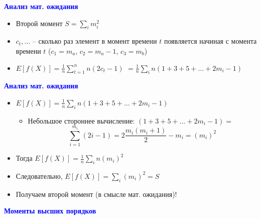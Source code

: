 \documentclass[landscape]{slides}
\begin{document}
\begin{normalsize}
\begin{slide}
\textbf{\textcolor{blue}{Анализ мат. ожидания}}

\begin{itemize}
\item Второй момент $S=\sum_i m_i^2$
\item $c_t,\ldots$ -- сколько раз элемент в момент времени $t$ появляется начиная с момента времени $t$ ($c_1=m_a$, $c_2=m_a-1$, $c_3=m_b$)
\item $E[f(X)] = \frac 1n \sum_{t=1}^n n(2c_t-1)$
$ = \frac 1n \sum_i n(1+3+5+\ldots+2m_i-1) $
\end{itemize}
\end{slide}


\begin{slide}
\textbf{\textcolor{blue}{Анализ мат. ожидания}}

\begin{itemize}
\item $E[f(X)] = \frac 1n \sum_i n(1+3+5+\ldots+2m_i-1) $
  \begin{itemize}
  \item Небольшое стороннее вычисление: $(1+3+5+\ldots+2m_i-1) =$
$$ \sum_{i=1}^{m_i}(2i-1) = 2 \frac {m_i(m_i+1)}2 - m_i = (m_i)^2 $$
  \end{itemize}
\item Тогда $E[f(X)] = \frac 1n \sum_i n (m_i)^2$
\item Следовательно, $E[f(X)] = \sum_i (m_i)^2 = S$
\item Получаем второй момент (в смысле мат. ожидания)!
\end{itemize}
\end{slide}


\begin{slide}
\textbf{\textcolor{blue}{Моменты высших порядков}}


\end{slide}
\end{normalsize}
\end{document}
